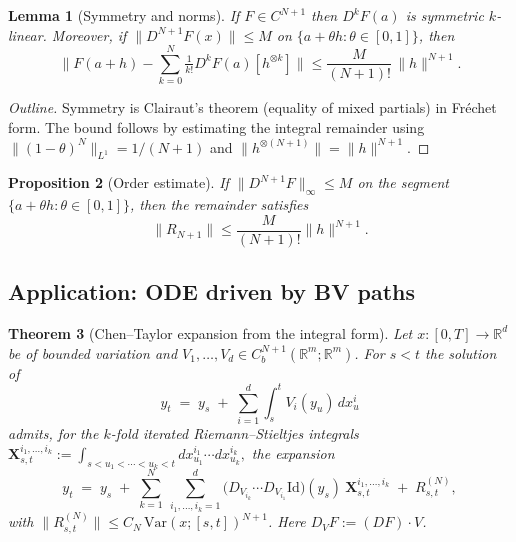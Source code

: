 \documentclass[12pt]{article}
\newtheorem{theorem}{Theorem}[section]
\newtheorem{proposition}[theorem]{Proposition}
\newtheorem{lemma}[theorem]{Lemma}
\begin{document}
\begin{lemma}[Symmetry and norms]
If $F\in C^{N+1}$ then $D^kF(a)$ is symmetric $k$-linear. Moreover, if
$\|D^{N+1}F(x)\|\le M$ on $\{a+\theta h:\theta\in[0,1]\}$, then
\[
\big\|F(a+h)-\sum_{k=0}^{N}\tfrac{1}{k!}D^kF(a)[h^{\otimes k}]\big\|
\le \frac{M}{(N+1)!}\,\|h\|^{N+1}.
\]
\end{lemma}

\begin{proof}[Outline]
Symmetry is Clairaut’s theorem (equality of mixed partials) in Fr\'echet form. The bound follows by estimating the integral remainder using $\|(1-\theta)^N\|_{L^1}=1/(N+1)$ and $\|h^{\otimes (N+1)}\|=\|h\|^{N+1}$.
\end{proof}

\begin{proposition}[Order estimate]
If $\|D^{N+1}F\|_\infty \le M$ on the segment $\{a+\theta h: \theta\in[0,1]\}$, 
then the remainder satisfies 
\[
\|R_{N+1}\| \le \frac{M}{(N+1)!} \|h\|^{N+1}.
\]
\end{proposition}

\medskip

\subsection{Application: ODE driven by BV paths}

\begin{theorem}[Chen--Taylor expansion from the integral form]
Let $x:[0,T]\to\mathbb{R}^d$ be of bounded variation and $V_1,\dots,V_d\in C^{N+1}_b(\mathbb{R}^m;\mathbb{R}^m)$.
For $s<t$ the solution of
\[
y_t \;=\; y_s \;+\; \sum_{i=1}^d \int_s^t V_i(y_u)\,dx_u^i
\]
admits, for the $k$-fold iterated Riemann--Stieltjes integrals
\(
\mathbf X^{i_1,\dots,i_k}_{s,t}:=\int_{s<u_1<\cdots<u_k<t} dx_{u_1}^{i_1}\cdots dx_{u_k}^{i_k},
\)
the expansion
\[
y_t \;=\; y_s \;+\; \sum_{k=1}^N \ \sum_{i_1,\dots,i_k=1}^d
\big(D_{V_{i_k}}\cdots D_{V_{i_1}}\mathrm{Id}\big)(y_s)\ \mathbf X^{i_1,\dots,i_k}_{s,t}
\;+\; R^{(N)}_{s,t},
\]
with $\|R^{(N)}_{s,t}\|\le C_N\,\mathrm{Var}(x;[s,t])^{N+1}$. Here $D_{V}F:=(DF)\cdot V$.
\end{theorem}
\end{document}
